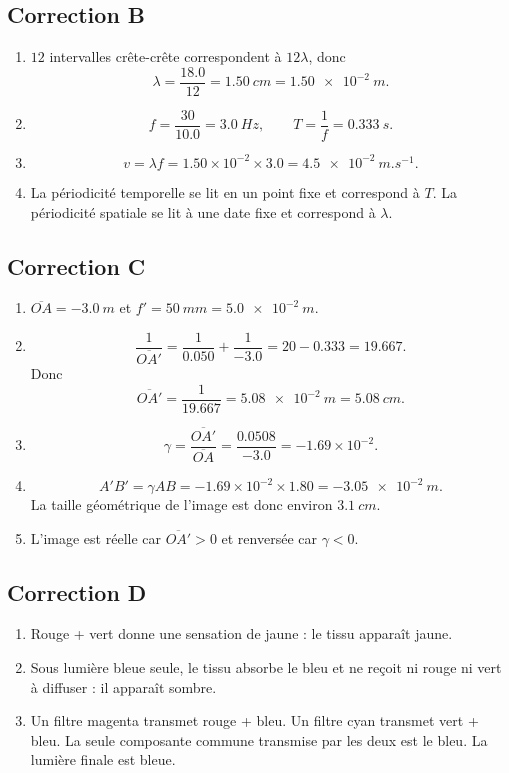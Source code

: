 \documentclass[11pt,a4paper]{article}
\begin{document}
\subsection*{Correction B}
\begin{enumerate}[label=\arabic*)]
  \item $12$ intervalles crête-crête correspondent à $12\lambda$, donc
  \[
  \lambda=\frac{18.0}{12}=\SI{1.50}{cm}=\SI{1.50e-2}{m}.
  \]
  \item
  \[
  f=\frac{30}{10.0}=\SI{3.0}{Hz},\qquad T=\frac{1}{f}=\SI{0.333}{s}.
  \]
  \item
  \[
  v=\lambda f=1.50\times10^{-2}\times3.0=\SI{4.5e-2}{m.s^{-1}}.
  \]
  \item La périodicité temporelle se lit en un point fixe et correspond à $T$. La périodicité spatiale se lit à une date fixe et correspond à $\lambda$.
\end{enumerate}

\subsection*{Correction C}
\begin{enumerate}[label=\arabic*)]
  \item $\overline{OA}=\SI{-3.0}{m}$ et $f'=\SI{50}{mm}=\SI{5.0e-2}{m}$.
  \item
  \[
  \frac{1}{\overline{OA'}}=\frac{1}{0.050}+\frac{1}{-3.0}=20-0.333=19.667.
  \]
  Donc
  \[
  \overline{OA'}=\frac{1}{19.667}=\SI{5.08e-2}{m}=\SI{5.08}{cm}.
  \]
  \item
  \[
  \gamma=\frac{\overline{OA'}}{\overline{OA}}=\frac{0.0508}{-3.0}=-1.69\times10^{-2}.
  \]
  \item
  \[
  A'B'=\gamma AB=-1.69\times10^{-2}\times1.80=-\SI{3.05e-2}{m}.
  \]
  La taille géométrique de l'image est donc environ $\SI{3.1}{cm}$.
  \item L'image est réelle car $\overline{OA'}>0$ et renversée car $\gamma<0$.
\end{enumerate}

\subsection*{Correction D}
\begin{enumerate}[label=\arabic*)]
  \item Rouge + vert donne une sensation de jaune : le tissu apparaît jaune.
  \item Sous lumière bleue seule, le tissu absorbe le bleu et ne reçoit ni rouge ni vert à diffuser : il apparaît sombre.
  \item Un filtre magenta transmet rouge + bleu. Un filtre cyan transmet vert + bleu. La seule composante commune transmise par les deux est le bleu. La lumière finale est bleue.
\end{enumerate}
\end{document}
